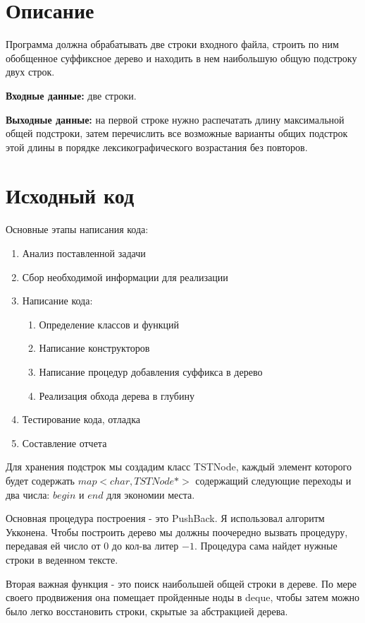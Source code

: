 \section{Описание}
Программа должна обрабатывать две строки входного файла, строить по ним обобщенное суффиксное дерево и находить в нем наибольшую общую подстроку двух строк.

{\bfseries Входные данные:} две строки.

{\bfseries Выходные данные:} на первой строке нужно распечатать длину максимальной общей подстроки, затем перечислить все возможные варианты общих подстрок этой длины в порядке лексикографического возрастания без повторов.

\pagebreak

\section{Исходный код}
Основные этапы написания кода:
\begin{enumerate}
\item Анализ поставленной задачи
\item Сбор необходимой информации для реализации
\item Написание кода:
\begin{enumerate}
\item Определение классов и функций
\item Написание конструкторов
\item Написание процедур добавления суффикса в дерево
\item Реализация обхода дерева в глубину
\end{enumerate}
\item Тестирование кода, отладка
\item Составление отчета
\end{enumerate}


Для хранения подстрок мы создадим класс TSTNode, каждый элемент которого будет содержать $map<char, TSTNode*>$ содержащий следующие переходы и два числа: $begin$ и $end$  для экономии места. 

Основная процедура построения - это PushBack.
Я использовал алгоритм Укконена. Чтобы построить дерево мы должны поочередно вызвать процедуру, передавая ей число от $0$ до кол-ва литер $- 1$. Процедура сама найдет нужные строки в веденном тексте.

Вторая важная функция - это поиск наибольшей общей строки в дереве. По мере своего продвижения она помещает пройденные ноды в deque, чтобы затем можно было легко восстановить строки, скрытые за абстракцией дерева.


